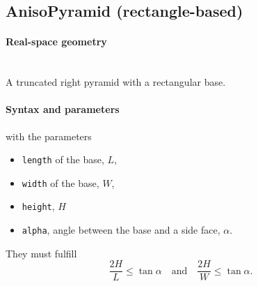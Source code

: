 \subsection{AnisoPyramid (rectangle-based)} \label{sec:AnisoPyramid} 

\paragraph{Real-space geometry}\strut\\
A truncated right pyramid with a rectangular base.

\begin{figure}[h]
\hfill
{}
\hfill
{}
\hfill
\end{figure}

\FloatBarrier

\paragraph{Syntax and parameters}
\begin{quote}
\end{quote}
with the parameters
\begin{itemize}
\item \texttt{length} of the base, $L$,
\item \texttt{width} of the base, $W$,
\item \texttt{height}, $H$
\item \texttt{alpha}, angle between the base and a side face, $\alpha$.
\end{itemize}
They must fulfill
\begin{displaymath}
\dfrac{2H}{L}\le\tan\alpha\quad\text{and}\quad\dfrac{2H}{W}\le\tan\alpha.
\end{displaymath}

